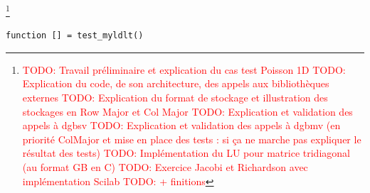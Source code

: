 \documentclass{article}
\begin{document}
\footnote{\textcolor{red}{TODO: Travail préliminaire et explication du cas test Poisson 1D}\newline
\textcolor{red}{TODO: Explication du code, de son architecture, des appels aux bibliothèques externes}\newline
\textcolor{red}{TODO: Explication du format de stockage et illustration des stockages en Row Major et Col Major}\newline
\textcolor{red}{TODO: Explication et validation des appels à dgbsv}\newline
\textcolor{red}{TODO: Explication et validation des appels à dgbmv (en priorité ColMajor et mise en place des tests : si ça ne marche pas expliquer le résultat des tests)}\newline
\textcolor{red}{TODO: Implémentation du LU pour matrice tridiagonal (au format GB en C)}\newline
\textcolor{red}{TODO: Exercice Jacobi et Richardson avec implémentation Scilab}\newline
\textcolor{red}{TODO: + finitions}}

\begin{verbatim}
function [] = test_myldlt()
\end{verbatim}
\end{document}
